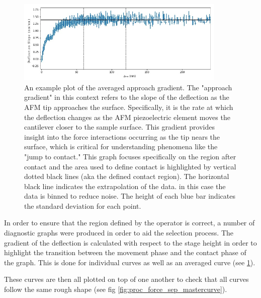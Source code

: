\begin{figure}[h!!!!]    
        \begin{center}
          \includegraphics[width=100mm]{chapter4/gradientGraph.png}
\end{center}
\caption{An example plot of the averaged approach gradient. The "approach gradient" in this context refers to the slope of the deflection as the AFM tip approaches the surface. Specifically, it is the rate at which the deflection changes as the AFM piezoelectric element moves the cantilever closer to the sample surface. This gradient provides insight into the force interactions occurring as the tip nears the surface, which is critical for understanding phenomena like the "jump to contact." This graph focuses specifically on the region after contact and the area used to define contact is highlighted by vertical dotted black lines (aka the defined contact region). The horizontal black line indicates the extrapolation of the data. in this case the data is binned to reduce noise. The height of each blue bar indicates the standard deviation for each point.} %
\label{fig:EgAvgDeriv}                
\end{figure}

In order to ensure that the region defined by the operator is correct, a number of diagnostic graphs were produced in order to aid the selection process. The gradient of the deflection is calculated with respect to the stage height in order to highlight the transition between the movement phase and the contact phase of the graph. This is done for individual curves as well as an averaged curve (see \ref{fig:EgAvgDeriv}).

\newpage

These curves are then all plotted on top of one another to check that all curves follow the same rough shape (see fig \ref{fig:proc_force_sep_mastercurve}).

